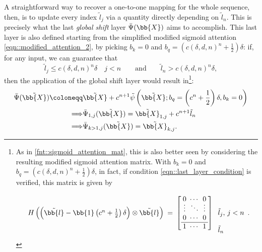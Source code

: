 A straightforward way to recover a one-to-one mapping for the whole sequence, then, is to update every index $\tilde{l}_j$ via a quantity directly depending on $\tilde{l}_n$. This is precisely what the last \emph{global shift} layer $\bar{\Psi}(\bb{X})$ aims to accomplish. This last layer is also defined starting from the simplified modified sigmoid attention \cref{eqn::modified_attention_2}, by picking $b_k=0$ and $b_q=\left(c(\delta,d,n)^n+\frac{1}{2}\right)\delta$: if, for any input, we can guarantee that
\begin{equation}
    \tilde{l}_j\leq c(\delta,d,n)^n\delta\quad j<n\qquad\text{and}\qquad \tilde{l}_n>c(\delta,d,n)^n\delta,
    \label{eqn::last_layer_condition}
\end{equation}
then the application of the global shift layer would result in\footnote{As in \cref{fnt::sigmoid_attention_mat}, this is also better seen by considering the resulting modified sigmoid attention matrix. With $b_k=0$ and $b_q=\left(c(\delta,d,n)^n+\frac{1}{2}\right)\delta$, in fact, if condition \cref{eqn::last_layer_condition} is verified, this matrix is given by
\begin{equation}
    \arraycolsep=2.5pt
    \begin{array}{rcl}
    \begin{array}{c}
        H\left(\left(\tilde{\bb{l}}-\bb{1}\left(c^n+\frac{1}{2}\right)\delta\right)\otimes\tilde{\bb{l}}\right)
    \end{array}=&
    \left[\begin{array}{ccc}
    0      & \cdots & 0      \\[-1ex]
    \vdots & \ddots & \vdots \\
    0      & \cdots & 0      \\\hline
    1      & \cdots & 1      \\
    \end{array}\right]&
    \begin{array}{l}
    \\
    \\
    \tilde{l}_j,\,j<n\\
    \\
    \tilde{l}_n\\
    \end{array}
    \end{array}.
\end{equation}
}:
\begin{equation}
\begin{split}
    \bar{\Psi}(\tilde{\bb{X}})\coloneqq&\tilde{\bb{X}} + c^{n+1}\tilde{\psi}\left(\tilde{\bb{X}};b_q=\left(c^n+\frac{1}{2}\right)\delta,b_k=0\right)\\
    \Longrightarrow &\bar{\Psi}_{1,j}(\tilde{\bb{X}}) = \tilde{\bb{X}}_{1,j} + c^{n+1}\tilde{l}_n\\
    \Longrightarrow &\bar{\Psi}_{k>1,j}(\tilde{\bb{X}})=\tilde{\bb{X}}_{k,j}.
\end{split}
\label{eqn::global_shift}
\end{equation}

